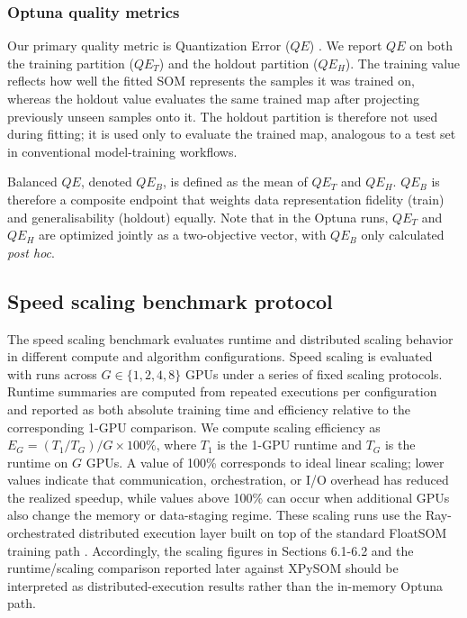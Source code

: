 \documentclass[11pt]{article}
\begin{document}
\subsubsection{Optuna quality metrics}

Our primary quality metric is Quantization Error ($QE$) \citep{kohonenSelfOrganizingMaps2001}. We report $QE$ on both the training partition ($QE_T$) and the holdout partition ($QE_H$). The training value reflects how well the fitted SOM represents the samples it was trained on, whereas the holdout value evaluates the same trained map after projecting previously unseen samples onto it. The holdout partition is therefore not used during fitting; it is used only to evaluate the trained map, analogous to a test set in conventional model-training workflows.

Balanced $QE$, denoted $QE_B$, is defined as the mean of $QE_T$ and $QE_H$. $QE_B$ is therefore a composite endpoint that weights data representation fidelity (train) and generalisability (holdout) equally. Note that in the Optuna runs, $QE_T$ and $QE_H$ are optimized jointly as a two-objective vector, with $QE_B$ only calculated \emph{post hoc}.

\subsection{Speed scaling benchmark protocol}

The speed scaling benchmark evaluates runtime and distributed scaling behavior in different compute and algorithm configurations. Speed scaling is evaluated with runs across $G\in\{1,2,4,8\}$ GPUs under a series of fixed scaling protocols. Runtime summaries are computed from repeated executions per configuration and reported as both absolute training time and efficiency relative to the corresponding 1-GPU comparison. We compute scaling efficiency as $E_G=(T_1/T_G)/G \times 100\%$, where $T_1$ is the 1-GPU runtime and $T_G$ is the runtime on $G$ GPUs. A value of 100\% corresponds to ideal linear scaling; lower values indicate that communication, orchestration, or I/O overhead has reduced the realized speedup, while values above 100\% can occur when additional GPUs also change the memory or data-staging regime. These scaling runs use the Ray-orchestrated distributed execution layer built on top of the standard FloatSOM training path \citep{moritzRayDistributedFramework2018}. Accordingly, the scaling figures in Sections 6.1-6.2 and the runtime/scaling comparison reported later against XPySOM should be interpreted as distributed-execution results rather than the in-memory Optuna path.
\end{document}
